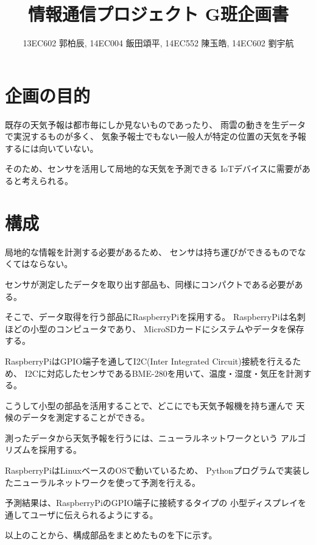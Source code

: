 \documentclass{jsarticle}
\title{情報通信プロジェクト G班企画書}
\author{13EC602 郭柏辰, 14EC004 飯田頌平, 14EC552 陳玉皓, 14EC602 劉宇航}
\begin{document}
	\maketitle
	
	
		\section{企画の目的}
		
			既存の天気予報は都市毎にしか見ないものであったり、
			雨雲の動きを生データで実況するものが多く、
			気象予報士でもない一般人が特定の位置の天気を予報するには向いていない。
			
			そのため、センサを活用して局地的な天気を予測できる
			IoTデバイスに需要があると考えられる。
		
		\section{構成}
		
			局地的な情報を計測する必要があるため、
			センサは持ち運びができるものでなくてはならない。
			
			センサが測定したデータを取り出す部品も、同様にコンパクトである必要がある。
			
			そこで、データ取得を行う部品にRaspberryPiを採用する。
			RaspberryPiは名刺ほどの小型のコンピュータであり、
			MicroSDカードにシステムやデータを保存する。
			
			RaspberryPiはGPIO端子を通してI2C(Inter Integrated Circuit)接続を行えるため、
			I2Cに対応したセンサであるBME-280を用いて、温度・湿度・気圧を計測する。
			
			こうして小型の部品を活用することで、どこにでも天気予報機を持ち運んで
			天候のデータを測定することができる。
			
			測ったデータから天気予報を行うには、ニューラルネットワーク\cite{Schmidhuber}という
			アルゴリズムを採用する。
			
			RaspberryPiはLinuxベースのOSで動いているため、
			Pythonプログラムで実装したニューラルネットワークを使って予測を行える。
			
			予測結果は、RaspberryPiのGPIO端子に接続するタイプの
			小型ディスプレイを通してユーザに伝えられるようにする。
		
			以上のことから、構成部品をまとめたものを下に示す。
		
\end{document}
